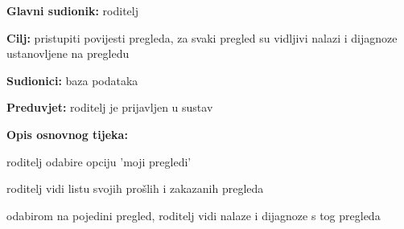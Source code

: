                      \noindent {}
					\begin{packed_item}
	
						\item \textbf{Glavni sudionik: }roditelj
						\item  \textbf{Cilj:} pristupiti povijesti pregleda, za svaki pregled su vidljivi nalazi i dijagnoze ustanovljene na pregledu
						\item  \textbf{Sudionici:} baza podataka
						\item  \textbf{Preduvjet:} roditelj je prijavljen u sustav
						\item  \textbf{Opis osnovnog tijeka:}
						
						\item[] \begin{packed_enum}
	
							\item roditelj odabire opciju 'moji pregledi'
							\item roditelj vidi listu svojih prošlih i zakazanih pregleda
							\item odabirom na pojedini pregled, roditelj vidi nalaze i dijagnoze s tog pregleda

						\end{packed_enum}
					\end{packed_item}

